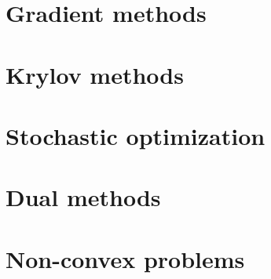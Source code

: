 \documentclass[11pt]{article}
\begin{document}
\maketitle



\pagebreak

\setcounter{tocdepth}{2}
\tableofcontents

\pagebreak

\part{Gradient methods}





\part{Krylov methods}




\part{Stochastic optimization}



\part{Dual methods}




\part{Non-convex problems}









\end{document}
